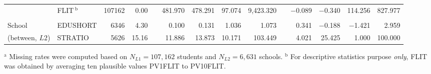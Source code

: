 {\begin{tabular}{llrr c@{\hskip 7.5mm} rrrr c@{\hskip 7.5mm} rrrr}
    & {FLIT}$\, ^\text{b}$  & 107162 & 0.00  &       & 481.970 & 478.291 & 97.074 & 9,423.320 &       & $-$0.089 & $-$0.340 & 114.256 & 827.977 \\
    &       &       &       &       &       &       &       &       &       &       &       &       &  \\
    School & {EDUSHORT} & 6346  & 4.30  &       & 0.100 & 0.131 & 1.036 & 1.073 &       & 0.341 & $-$0.188 & $-$1.421 & 2.959 \\
    (between, $L2$) & {STRATIO} & 5626  & 15.16 &       & 11.886 & 13.873 & 10.171 & 103.449 &       & 4.021 & 25.425 & 1.000 & 100.000 \\
    \bottomrule
    \end{tabular}
}{$^\text{a}$ Missing rates were computed based on $N_{L1} = 107,162$ students and $N_{L2} = 6,631$ schools. $^\text{b}$ For descriptive statistics purpose \emph{only}, {FLIT} was obtained by averaging ten plausible values {PV1FLIT} to {PV10FLIT}.}
